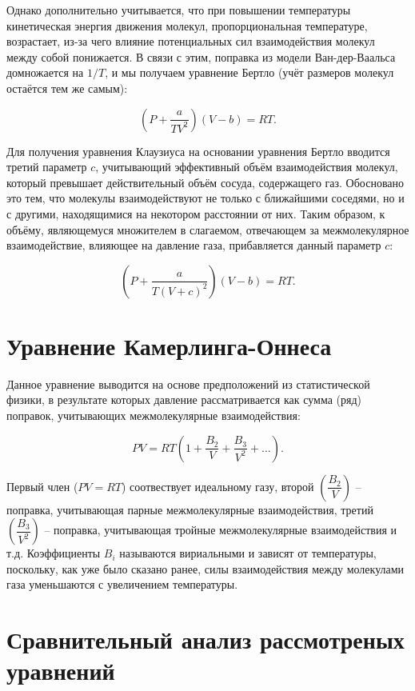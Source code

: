 \documentclass[12pt]{article} %
\begin{document}
Однако дополнительно учитывается, что при повышении температуры кинетическая энергия движения молекул, пропорциональная температуре, возрастает, из-за чего влияние потенциальных сил взаимодействия молекул между собой понижается.
В связи с этим, поправка из модели Ван-дер-Ваальса домножается на $1/T$, и мы получаем уравнение Бертло (учёт размеров молекул остаётся тем же самым):

\begin{equation}
\left(P + \frac{a}{TV^2}\right)(V - b) = RT.
\end{equation}

Для получения уравнения Клаузиуса на основании уравнения Бертло вводится третий параметр $c$, учитывающий эффективный объём взаимодействия молекул, который превышает действительный объём сосуда, содержащего газ.
Обосновано это тем, что молекулы взаимодействуют не только с ближайшими соседями, но и с другими, находящимися на некотором расстоянии от них. Таким образом, к объёму, являющемуся множителем в слагаемом, отвечающем за межмолекулярное взаимодействие, влияющее на давление газа, прибавляется данный параметр $c$:

\begin{equation}
\left(P + \frac{a}{T(V + c)^2}\right)(V - b) = RT.
\end{equation}

\section*{Уравнение Камерлинга-Оннеса}
Данное уравнение выводится на основе предположений из статистической физики, в результате которых давление рассматривается как сумма (ряд) поправок, учитывающих межмолекулярные взаимодействия:

\begin{equation}
PV = RT\left(1 + \frac{B_2}{V} + \frac{B_3}{V^2} + \ldots\right).
\end{equation}

Первый член ($PV = RT$) соотвествует идеальному газу, второй $\left(\dfrac{B_2}{V}\right)$ -- поправка, учитывающая парные межмолекулярные взаимодействия, третий $\left(\dfrac{B_3}{V^2}\right)$ -- поправка, учитывающая тройные межмолекулярные взаимодействия и т.д. Коэффициенты $B_i$ называются вириальными и зависят от температуры, поскольку, как уже было сказано ранее, силы взаимодействия между молекулами газа уменьшаются с увеличением температуры.

\section*{Сравнительный анализ рассмотреных уравнений}
\end{document}
